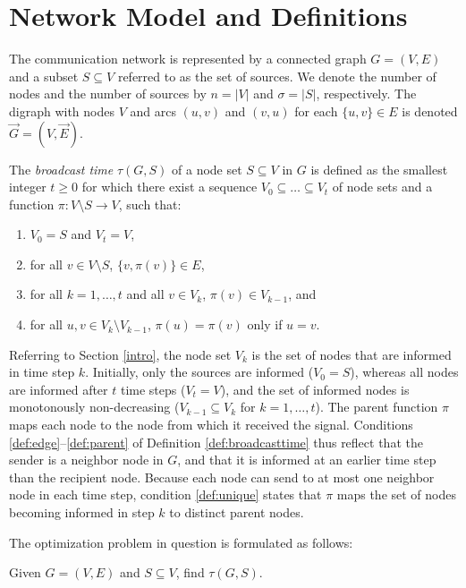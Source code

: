 \section{Network Model and Definitions} \label{sec:def}

The communication network is represented by a connected graph $G=(V,E)$ and a subset $S\subseteq V$ referred to as the set of sources.
We denote the number of nodes and the number of sources by $n=|V|$ and $\sigma=|S|$, respectively. 
The digraph with nodes $V$ and arcs $(u,v)$ and $(v,u)$ for each $\{u,v\}\in E$ is denoted $\overrightarrow{G}=(V,\overrightarrow{E})$.

\begin{definition} \label{def:broadcasttime}
The \emph{broadcast time} $\tau(G,S)$ of a node set $S\subseteq V$ in $G$ is defined as the smallest integer $t\geq 0$ for which there exist
a sequence $V_0\subseteq\dots\subseteq V_t$ of node sets and a function $\pi:V\setminus S\to V$, such that:
\begin{enumerate}
  \item $V_0=S$ and $V_t=V$, \label{def:boundary}
  \item for all $v\in V\setminus S$, $\{v,\pi(v)\}\in E$, \label{def:edge}
  \item for all $k=1,\ldots,t$ and all $v\in V_k$, $\pi(v)\in V_{k-1}$, and \label{def:parent}
  \item for all $u,v\in V_k\setminus V_{k-1}$, $\pi(u)=\pi(v)$ only if $u=v$. \label{def:unique}
\end{enumerate}
\end{definition}

Referring to Section \ref{intro}, the node set $V_k$ is the set of nodes that are informed in time step $k$.
Initially, only the sources are informed ($V_0=S$), whereas all nodes are informed after $t$ time steps ($V_t=V$),
and the set of informed nodes is monotonously non-decreasing ($V_{k-1}\subseteq V_k$ for $k=1,\ldots,t$).
The parent function $\pi$ maps each node to the node from which it received the signal.
Conditions \ref{def:edge}--\ref{def:parent} of Definition \ref{def:broadcasttime} thus reflect that the sender is a neighbor node in $G$,
and that it is informed at an earlier time step than the recipient node.
Because each node can send to at most one neighbor node in each time step,
condition \ref{def:unique} states that $\pi$ maps the set of nodes becoming informed in step $k$ to distinct parent nodes.

The optimization problem in question is formulated as follows:
\begin{problem}\label{prob:min}
Given $G=(V,E)$ and $S\subseteq V$, find $\tau(G,S)$.
\end{problem}

